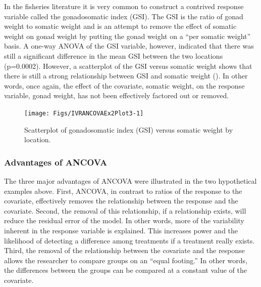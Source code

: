 \documentclass[10pt,openany]{book}\usepackage[]{graphicx}\usepackage[]{color}
\newenvironment{knitrout}{}{} %
\begin{document}
In the fisheries literature it is very common to construct a contrived response variable called the gonadosomatic index (GSI).  The GSI is the ratio of gonad weight to somatic weight and is an attempt to remove the effect of somatic weight on gonad weight by putting the gonad weight on a ``per somatic weight'' basis.  A one-way ANOVA of the GSI variable, however, indicated that there was still a significant difference in the mean GSI between the two locations (p=0.0002).  However, a scatterplot of the GSI versus somatic weight shows that there is still a strong relationship between GSI and somatic weight ().  In other words, once again, the effect of the covariate, somatic weight, on the response variable, gonad weight, has not been effectively factored out or removed.

\begin{knitrout}
\color{fgcolor}\begin{figure}[h]

{\centering \texttt{[image: Figs/IVRANCOVAEx2Plot3-1]} 

}

\caption[Scatterplot of gonadosomatic index (GSI) versus somatic weight by location]{Scatterplot of gonadosomatic index (GSI) versus somatic weight by location.}\label{fig:IVRANCOVAEx2Plot3}
\end{figure}


\end{knitrout}

\subsubsection*{Advantages of ANCOVA}
The three major advantages of ANCOVA were illustrated in the two hypothetical examples above.  First, ANCOVA, in contrast to ratios of the response to the covariate, effectively removes the relationship between the response and the covariate. Second, the removal of this relationship, if a relationship exists, will reduce the residual error of the model.  In other words, more of the variability inherent in the response variable is explained.  This increases power and the likelihood of detecting a difference among treatments if a treatment really exists.  Third, the removal of the relationship between the covariate and the response allows the researcher to compare groups on an ``equal footing.'' In other words, the differences between the groups can be compared at a constant value of the covariate.
\end{document}
